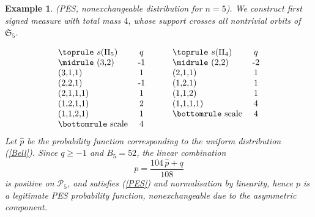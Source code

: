 \documentclass{article}
\newtheorem{example}{Example}
\begin{document}
\begin{example}{\rm (PES, nonexchangeable    distribution for $n=5$).  We construct first signed measure with total mass $4$, whose support crosses all nontrivial orbits of ${\mathfrak S}_5$.

\[
\begin{tabular}{@{}c@{\qquad}c@{}}
\begin{tabular}[t]{lc}
\toprule
$s(\Pi_5)$ & $q$ \\
\midrule
(3,2)       & -1 \\
(3,1,1)     & 1 \\
(2,2,1)     & -1 \\
(2,1,1,1)   & 1 \\
(1,2,1,1)   & 2 \\
(1,1,2,1)   & 1 \\
\bottomrule
scale & 4 \\
\end{tabular}
&
\begin{tabular}[t]{lc}
\toprule
$s(\Pi_4)$ & $q$ \\
\midrule
(2,2)       & -2 \\
(2,1,1)     & 1 \\
(1,2,1)     & 1 \\
(1,1,2)     & 1 \\
(1,1,1,1)   & 4 \\
\bottomrule
scale & 4 \\
\end{tabular}
\end{tabular}
\]
Let $\widehat{p}$ be the probability function corresponding to the uniform distribution (\ref{Bell}). 
Since $q\geq -1$ and $B_5=52$, the linear combination
$$p=  \frac{104 \,\widehat{p}+q}   {108}$$
is positive on ${\mathcal P}_5$, and satisfies (\ref{PES}) and normalisation by linearity, hence $p$ is a legitimate PES probability function, 
nonexchangeable due to the asymmetric component.
}
\end{example}
\vskip0.2cm
\end{document}
